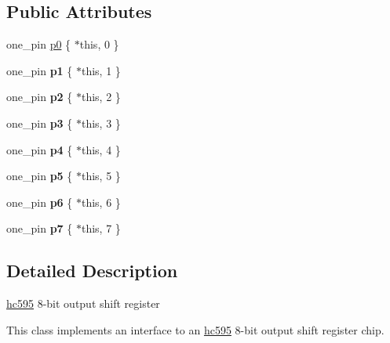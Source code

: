 \subsection*{Public Attributes}
\textbf{ }\par
\begin{DoxyCompactItemize}
\item 
one\+\_\+pin \hyperlink{classhwlib_1_1hc595_a5e124516aa762629f95c7ab63e0b3d18}{p0} \{ $\ast$this, 0 \}
\item 
\mbox{\label{classhwlib_1_1hc595_a2f83cce5a65436a22b18a9eae016535c}} 
one\+\_\+pin {\bfseries p1} \{ $\ast$this, 1 \}
\item 
\mbox{\label{classhwlib_1_1hc595_abcdcdb111610864066f7dcb601473c26}} 
one\+\_\+pin {\bfseries p2} \{ $\ast$this, 2 \}
\item 
\mbox{\label{classhwlib_1_1hc595_a1e2958a2516802e2d6010f53c26802bd}} 
one\+\_\+pin {\bfseries p3} \{ $\ast$this, 3 \}
\item 
\mbox{\label{classhwlib_1_1hc595_ac0b7be902f6bcaeccc77eaac57836131}} 
one\+\_\+pin {\bfseries p4} \{ $\ast$this, 4 \}
\item 
\mbox{\label{classhwlib_1_1hc595_a071e5983d048d42902099cd432b11cae}} 
one\+\_\+pin {\bfseries p5} \{ $\ast$this, 5 \}
\item 
\mbox{\label{classhwlib_1_1hc595_a0e6cc70a4cb74a6a00f7d65f41744646}} 
one\+\_\+pin {\bfseries p6} \{ $\ast$this, 6 \}
\item 
\mbox{\label{classhwlib_1_1hc595_a28075ecea47020c790ea098e32ab0b5f}} 
one\+\_\+pin {\bfseries p7} \{ $\ast$this, 7 \}
\end{DoxyCompactItemize}



\subsection{Detailed Description}
\hyperlink{classhwlib_1_1hc595}{hc595} 8-\/bit output shift register

This class implements an interface to an \hyperlink{classhwlib_1_1hc595}{hc595} 8-\/bit output shift register chip.



